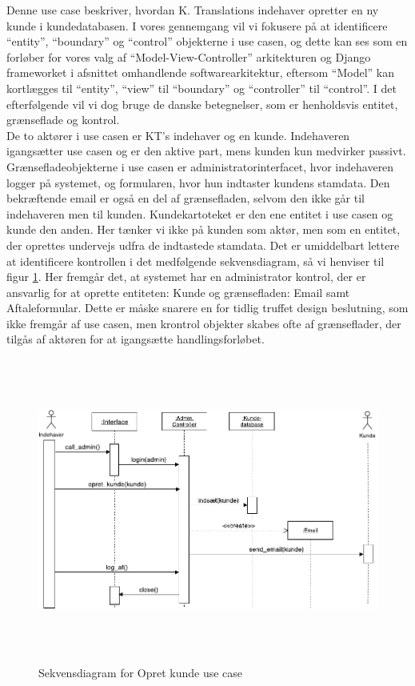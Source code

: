\documentclass[12pt]{article}   %
\begin{document}
Denne use case beskriver, hvordan K. Translations indehaver opretter en ny
kunde i kundedatabasen. I vores gennemgang vil vi fokusere på at identificere
``entity'', ``boundary'' og ``control'' objekterne i use casen, og dette kan 
ses som en forløber for vores valg af ``Model-View-Controller'' 
arkitekturen og Django frameworket i afsnittet omhandlende softwarearkitektur,
eftersom ``Model'' kan kortlægges til ``entity'', ``view'' til ``boundary'' 
og ``controller'' til ``control''. I det efterfølgende vil vi dog bruge de 
danske betegnelser, som er henholdsvis entitet, grænseflade og kontrol. \\
De to aktører i use casen er KT's indehaver og en kunde. Indehaveren
igangsætter use casen og er den aktive part, mens kunden kun medvirker
passivt. Grænsefladeobjekterne i use casen er administratorinterfacet, hvor indehaveren
logger på systemet, og formularen, hvor hun indtaster kundens stamdata. Den
bekræftende email er også en del af grænsefladen, selvom den ikke går til 
indehaveren men til kunden. Kundekartoteket er den ene entitet i use casen og
kunde den anden. Her tænker vi ikke på kunden som aktør, men som en entitet,
der oprettes undervejs udfra de indtastede stamdata. Det er umiddelbart
lettere at identificere kontrollen i det medfølgende sekvensdiagram, så vi
henviser til figur \ref{fig:opret}. Her fremgår det, at systemet har en
administrator kontrol, der er ansvarlig for at oprette entiteten: Kunde og
grænsefladen: Email samt Aftaleformular. Dette er måske snarere en for tidlig
truffet design beslutning, som ikke fremgår af use casen, men krontrol objekter
skabes ofte af grænseflader, der tilgås af aktøren for at igangsætte handlingsforløbet.    

\begin{figure}[!ht]
\includegraphics[width=14cm, height=10cm]{seqtwo.pdf}
\caption{Sekvensdiagram for Opret kunde use case}
\label{fig:opret}
\end{figure}
\end{document}
